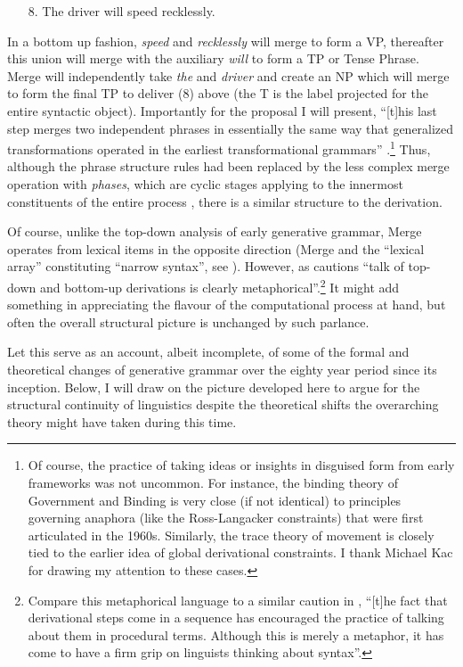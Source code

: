 \documentclass[output=paper]{langscibook}
\begin{document}
\begin{enumerate}
    \item[8.] The driver will speed recklessly.
\end{enumerate}

In a bottom up fashion, \emph{speed} and \emph{recklessly} will merge to form a VP, thereafter this union will merge with the auxiliary \emph{will} to form a TP or Tense Phrase. Merge will independently take \emph{the} and \emph{driver} and create an NP which will merge to form the final TP to deliver (8) above (the T is the label projected for the entire syntactic object). Importantly for the proposal I will present, ``[t]his last step merges two independent phrases in essentially the same way that generalized transformations operated in the earliest transformational grammars'' \citep[911]{Freidin2012}.\footnote{Of course, the practice of taking ideas or insights in disguised form from early frameworks was not uncommon. For instance, the binding theory of Government and Binding is very close (if not identical) to principles governing anaphora (like
the Ross-Langacker constraints) that were first articulated in the
1960s. Similarly, the trace theory of movement is closely
tied to the earlier idea of global derivational constraints. I thank Michael Kac for drawing my attention to these cases.} Thus, although the phrase structure rules had been replaced by the less complex merge operation with \emph{phases}, which are cyclic stages applying to the innermost constituents of the entire process \citep{Chomsky2008}, there is a similar structure to the derivation. 

Of course, unlike the top-down analysis of early generative grammar, Merge operates from lexical items in the opposite direction (Merge and the ``lexical array'' constituting ``narrow syntax'', see \citealt{Langendoen:2003}). However, as \citet[84]{Lobina2017} cautions ``talk of top-down and bottom-up derivations is clearly metaphorical''.\footnote{Compare this metaphorical language to a similar caution in \cite[496]{Pullum2013}, ``[t]he fact that derivational steps come in a sequence has encouraged the practice of talking about them in procedural terms. Although this is merely a metaphor, it has come to have a firm grip on linguists thinking about syntax''.} It might add something in appreciating the flavour of the computational process at hand, but often the overall structural picture is unchanged by such parlance. 

Let this serve as an account, albeit incomplete, of some of the formal and theoretical changes of generative grammar over the eighty year period since its inception. Below, I will draw on the picture developed here to argue for the structural continuity of linguistics despite the theoretical shifts the overarching theory might have taken during this time.
\end{document}
